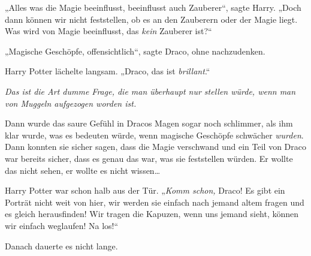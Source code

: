 „Alles was die Magie beeinflusst, beeinflusst auch Zauberer“, sagte Harry.
„Doch dann können wir nicht feststellen, ob es an den Zauberern oder der Magie liegt. Was wird von Magie beeinflusst, das \emph{kein} Zauberer ist?“

„Magische Geschöpfe, offensichtlich“, sagte Draco, ohne nachzudenken.

Harry Potter lächelte langsam.
„Draco, das ist \emph{brillant}.“

\emph{Das ist die Art dumme Frage, die man überhaupt nur stellen würde, wenn man von Muggeln aufgezogen worden ist.}

Dann wurde das saure Gefühl in Dracos Magen sogar noch schlimmer, als ihm klar wurde, was es bedeuten würde, wenn magische Geschöpfe schwächer \emph{wurden}. Dann konnten sie sicher sagen, dass die Magie verschwand und ein Teil von Draco war bereits sicher, dass es genau das war, was sie feststellen würden. Er wollte das nicht sehen, er wollte es nicht wissen…

Harry Potter war schon halb aus der Tür. „\emph{Komm schon,} Draco! Es gibt ein Porträt nicht weit von hier, wir werden sie einfach nach jemand altem fragen und es gleich herausfinden! Wir tragen die Kapuzen, wenn uns jemand sieht, können wir einfach weglaufen! Na los!“

\later

Danach dauerte es nicht lange.

